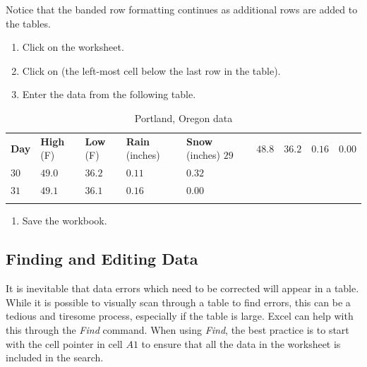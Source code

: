Notice that the banded row formatting continues as additional rows are added to the tables.

\begin{enumbox}
	\begin{enumerate}
		\item Click on the  worksheet.
		\item Click on  (the left-most cell below the last row in the table).
		\item Enter the data from the following table.
	\end{enumerate}
\end{enumbox}
	
\begin{table}[H]
	{\small
		\begin{longtable}{R{0.50in}R{0.50in}R{0.50in}R{0.50in}R{0.50in}} %
			\textbf{Day} & \textbf{High} (\textdegree F) & \textbf{Low} (\textdegree F) & \textbf{Rain} (inches) & \textbf{Snow} (inches) \endhead
			\hline
			$ 29 $ & $ 48.8 $ & $ 36.2 $ & $ 0.16 $ & $ 0.00 $ \\ 
			$ 30 $ & $ 49.0 $ & $ 36.2 $ & $ 0.11 $ & $ 0.32 $ \\ 
			$ 31 $ & $ 49.1 $ & $ 36.1 $ & $ 0.16 $ & $ 0.00 $ \\ 
			\caption{Portland, Oregon data}
			\label{05:tab03}
		\end{longtable}
	} %
\end{table}

\begin{enumbox}
	\begin{enumerate}
		\item Save the  workbook.
	\end{enumerate}
\end{enumbox}
	
\subsection{Finding and Editing Data}

It is inevitable that data errors which need to be corrected will appear in a table. While it is possible to visually scan through a table to find errors, this can be a tedious and tiresome process, especially if the table is large. Excel can help with this through the \textit{Find} command. When using \textit{Find}, the best practice is to start with the cell pointer in cell $ A1 $ to ensure that all the data in the worksheet is included in the search.

